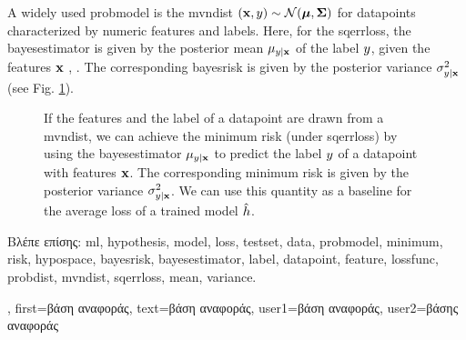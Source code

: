 {{\begin{enumerate}[label=\arabic*)]
   	\end{enumerate}
	A widely used \gls{probmodel} is the \gls{mvndist} $\left( {\bf x},y \right) \sim \mathcal{N}({\bm \mu},{\bm \Sigma})$ 
	for \gls{datapoint}s characterized by numeric \gls{feature}s and \gls{label}s.
	Here, for the \gls{sqerrloss}, the \gls{bayesestimator} is given by the posterior 
	\gls{mean} $\mu_{y|{\bf x}}$ of the \gls{label} $y$, given the 
	\gls{feature}s ${\bf x}$ \cite{LC}, \cite{GrayProbBook}. The corresponding \gls{bayesrisk} 
	is given by the posterior \gls{variance} 
	$\sigma^{2}_{y|{\bf x}}$ (see Fig. \ref{fig_post_baseline_dict}).
	\begin{figure}[H]
		\begin{center}
		\end{center}
		\caption{If the \gls{feature}s and the \gls{label} of a \gls{datapoint} are drawn from a \gls{mvndist}, we 
		can achieve the \gls{minimum} \gls{risk} (under \gls{sqerrloss}) by using the \gls{bayesestimator} $\mu_{y|{\bf x}}$ 
		to predict the \gls{label} $y$ of a \gls{datapoint} with \gls{feature}s ${\bf x}$. The corresponding 
		\gls{minimum} \gls{risk} is given by the posterior \gls{variance} $\sigma^{2}_{y|{\bf x}}$. We can use 
		this quantity as a baseline for the average \gls{loss} of a trained \gls{model} $\hat{h}$. \label{fig_post_baseline_dict}}
	\end{figure}
	\foreignlanguage{greek}{Βλέπε επίσης:} \gls{ml}, \gls{hypothesis}, \gls{model}, \gls{loss}, \gls{testset}, \gls{data}, \gls{probmodel}, \gls{minimum}, \gls{risk}, \gls{hypospace}, \gls{bayesrisk}, \gls{bayesestimator}, \gls{label}, \gls{datapoint}, \gls{feature}, \gls{lossfunc}, \gls{probdist}, \gls{mvndist}, \gls{sqerrloss}, \gls{mean}, \gls{variance}.},
    first={\foreignlanguage{greek}{βάση αναφοράς}},
    text={\foreignlanguage{greek}{βάση αναφοράς}},
    user1={\foreignlanguage{greek}{βάση αναφοράς}}, %
    user2={\foreignlanguage{greek}{βάσης αναφοράς}} %
}

